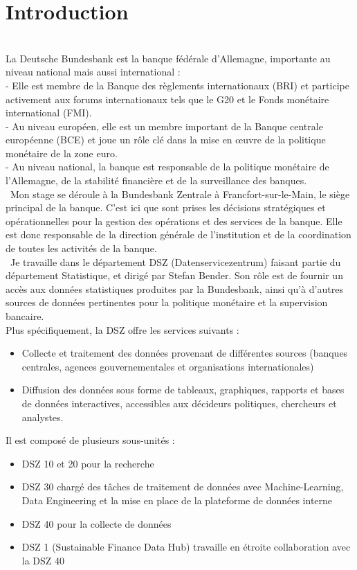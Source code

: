 \section*{Introduction} 
{}
\thispagestyle{noTitledHeader}
~\\
La Deutsche Bundesbank est la banque fédérale d'Allemagne, importante au niveau national mais aussi international : 
\\
- Elle est membre de la Banque des règlements internationaux (BRI) et participe activement aux forums internationaux tels que le G20 et le Fonds monétaire international (FMI). 
\\
- Au niveau européen, elle est un membre important de la Banque centrale européenne (BCE) et joue un rôle clé dans la mise en œuvre de la politique monétaire de la zone euro. 
\\
- Au niveau national, la banque est responsable de la politique monétaire de l'Allemagne, de la stabilité financière et de la surveillance des banques.
\\

~Mon stage se déroule à la Bundesbank Zentrale à Francfort-sur-le-Main, le siège principal de la banque. 
C'est ici que sont prises les décisions stratégiques et opérationnelles pour la gestion des opérations et des services de la banque.
Elle est donc responsable de la direction générale de l'institution et de la coordination de toutes les activités de la banque.
\\

~Je travaille dans le département DSZ (Datenservicezentrum) faisant partie du département Statistique, et dirigé par Stefan Bender. Son rôle est de fournir un accès aux données statistiques produites par la Bundesbank, 
ainsi qu'à d'autres sources de données pertinentes pour la politique monétaire et la supervision bancaire.
\\
Plus spécifiquement, la DSZ offre les services suivants :
\begin{itemize}
    \item Collecte et traitement des données provenant de différentes sources (banques centrales, agences gouvernementales et organisations internationales)
    \item Diffusion des données sous forme de tableaux, graphiques, rapports et bases de données interactives, accessibles aux décideurs politiques, chercheurs et analystes.
\end{itemize}
Il est composé de plusieurs sous-unités : 
\begin{itemize}
    \item DSZ 10 et 20 pour la recherche
    \item DSZ 30 chargé des tâches de traitement de données avec Machine-Learning, Data Engineering et la mise en place de la plateforme de données interne
    \item DSZ 40 pour la collecte de données
    \item DSZ 1 (Sustainable Finance Data Hub) travaille en étroite collaboration avec la DSZ 40
\end{itemize}

